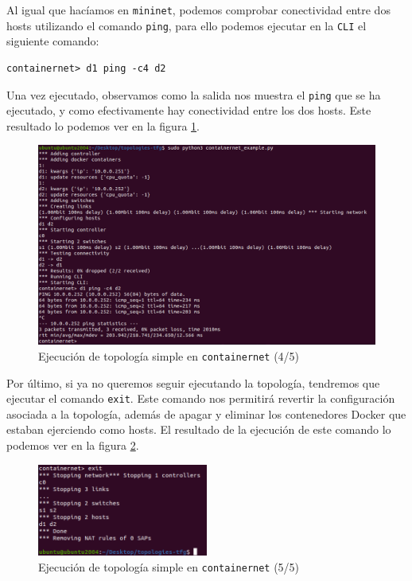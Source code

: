 \documentclass[12pt]{article}
\begin{document}
	\pagebreak

	\noindent Al igual que hacíamos en \texttt{mininet}, podemos comprobar conectividad entre dos hosts utilizando el comando \texttt{ping}, para ello podemos ejecutar en la \texttt{CLI} el siguiente comando:
	\begin{verbatim}
containernet> d1 ping -c4 d2
	\end{verbatim}

	\noindent Una vez ejecutado, observamos como la salida nos muestra el \texttt{ping} que se ha ejecutado, y como efectivamente hay conectividad entre los dos hosts. Este resultado lo podemos ver en la figura \ref{img: cn simple 4}.

	\begin{figure}[h!]
		\begin{center}
			\includegraphics[width=1\textwidth]{img/cn_example4.png}
			\caption{Ejecución de topología simple en \texttt{containernet} (4/5)}
			\label{img: cn simple 4}
		\end{center}
	\end{figure}

	\noindent Por último, si ya no queremos seguir ejecutando la topología, tendremos que ejecutar el comando \texttt{exit}. Este comando nos permitirá revertir la configuración asociada a la topología, además de apagar y eliminar los contenedores Docker que estaban ejerciendo como hosts. El resultado de la ejecución de este comando lo podemos ver en la figura \ref{img: cn simple 5}.

	\pagebreak

	\begin{figure}[h!]
		\begin{center}
			\includegraphics[width=0.5\textwidth]{img/cn_example5.png}
			\caption{Ejecución de topología simple en \texttt{containernet} (5/5)}
			\label{img: cn simple 5}
		\end{center}
	\end{figure}
	
\end{document}
